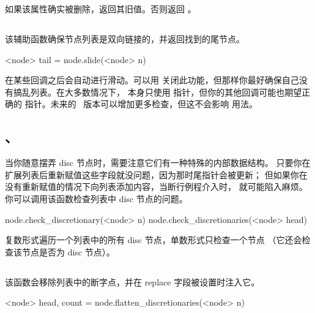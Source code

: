 如果该属性确实被删除，返回其旧值。否则返回 。

\subsection{}


该辅助函数确保节点列表是双向链接的，并返回找到的尾节点。

\begin{typing}
<node> tail =
    node.slide(<node> n)
\end{typing}

在某些回调之后会自动进行滑动。可以用 
关闭此功能，但那样你最好确保自己没有搞乱列表。在大多数情况下，
\TEX 本身只使用  指针，但你的其他回调可能也期望正确的
 指针。未来的 \LUATEX\ 版本可以增加更多检查，但这不会影响
用法。

\subsection{、}


当你随意摆弄 disc 节点时，需要注意它们有一种特殊的内部数据结构。
只要你在扩展列表后重新赋值这些字段就没问题，因为那时尾指针会被更新；
但如果你在没有重新赋值的情况下向列表添加内容，当断行例程介入时，
就可能陷入麻烦。你可以调用该函数检查列表中 disc 节点的问题。

\begin{typing}
node.check_discretionary(<node> n)
node.check_discretionaries(<node> head)
\end{typing}

复数形式遍历一个列表中的所有 disc 节点，单数形式只检查一个节点
（它还会检查该节点是否为 disc 节点）。

\subsection{}


该函数会移除列表中的断字点，并在 replace 字段被设置时注入它。

\begin{typing}
<node> head, count = node.flatten_discretionaries(<node> n)
\end{typing}

